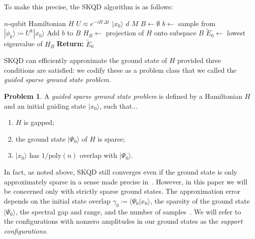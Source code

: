 \documentclass[
  reprint,            %
  amsmath,amssymb,
  aps,
  superscriptaddress, %
  longbibliography
]{revtex4-2}
\theoremstyle{definition}
\newtheorem{problem}{Problem}
\begin{document}
To make this precise, the SKQD algorithm is as follows:
\begin{algorithm}[H]
\caption{Sample-based Krylov quantum diagonalization}\label{alg:SKQD}
\begin{algorithmic}[1]
    \Require $n$-qubit Hamiltonian $H$ 
    \Require $U\approx e^{-iH\,\Delta t}$ 
    \Require $|x_0\rangle$ 
    \Require $d$ 
    \Require $M$ 
    \State $B \gets \emptyset$ 
            \State $b\gets$ sample from $|\phi_k\rangle \coloneqq U^k|x_0\rangle$ 
            \State Add $b$ to $B$ 
        \EndFor
    \EndFor
    \State $H_B \gets$ projection of $H$ onto subspace $B$ 
    \State $\tilde{E}_0 \gets$ lowest eigenvalue of $H_B$ 
    \State\textbf{Return:} $\tilde{E}_0$
\end{algorithmic}
\end{algorithm}
 
SKQD can efficiently approximate the ground state of $H$ provided three conditions are satisfied: we codify these as a problem class that we called the \emph{guided sparse ground state problem}.
\begin{problem}
\label{prob:guided_sparse_ground_state_problem}
    A \emph{guided sparse ground state problem} is defined by a Hamiltonian $H$ and an initial guiding state $|x_0\rangle$, such that...
    \begin{enumerate}
        \item $H$ is gapped;
        \item the ground state $|\Psi_0\rangle$ of $H$ is sparse;
        \item $|x_0\rangle$ has $1/\text{poly}(n)$ overlap with $|\Psi_0\rangle$.
    \end{enumerate}
\end{problem}
In fact, as noted above, SKQD still converges even if the ground state is only approximately sparse in a sense made precise in~\cite{yu2025quantum}.
However, in this paper we will be concerned only with strictly sparse ground states.
The approximation error depends on the initial state overlap ${\gamma_0\coloneqq\langle \Psi_0|x_0\rangle}$, the sparsity of the ground state $|\Psi_0\rangle$, the spectral gap and range, and the number of samples~\cite{yu2025quantum}.
We will refer to the configurations with nonzero amplitudes in our ground states as the \emph{support configurations}.
\end{document}
